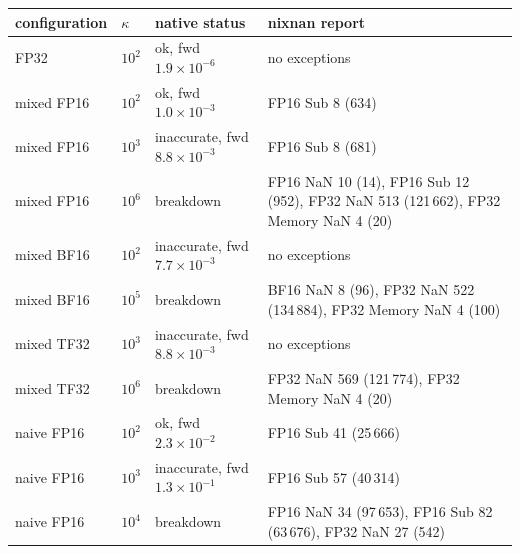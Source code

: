 \begin{tabular}{llp{3.2cm}p{5.8cm}}
\toprule
configuration & $\kappa$ & native status & nixnan report\\
\midrule
FP32 & $10^{2}$ & ok, fwd $1.9\!\times\!10^{-6}$ & no exceptions\\
mixed FP16 & $10^{2}$ & ok, fwd $1.0\!\times\!10^{-3}$ & FP16 Sub 8 (634)\\
mixed FP16 & $10^{3}$ & inaccurate, fwd $8.8\!\times\!10^{-3}$ & FP16 Sub 8 (681)\\
mixed FP16 & $10^{6}$ & breakdown & FP16 NaN 10 (14), FP16 Sub 12 (952), FP32 NaN 513 (121\,662), FP32 Memory NaN 4 (20)\\
mixed BF16 & $10^{2}$ & inaccurate, fwd $7.7\!\times\!10^{-3}$ & no exceptions\\
mixed BF16 & $10^{5}$ & breakdown & BF16 NaN 8 (96), FP32 NaN 522 (134\,884), FP32 Memory NaN 4 (100)\\
mixed TF32 & $10^{3}$ & inaccurate, fwd $8.8\!\times\!10^{-3}$ & no exceptions\\
mixed TF32 & $10^{6}$ & breakdown & FP32 NaN 569 (121\,774), FP32 Memory NaN 4 (20)\\
naive FP16 & $10^{2}$ & ok, fwd $2.3\!\times\!10^{-2}$ & FP16 Sub 41 (25\,666)\\
naive FP16 & $10^{3}$ & inaccurate, fwd $1.3\!\times\!10^{-1}$ & FP16 Sub 57 (40\,314)\\
naive FP16 & $10^{4}$ & breakdown & FP16 NaN 34 (97\,653), FP16 Sub 82 (63\,676), FP32 NaN 27 (542)\\
\bottomrule
\end{tabular}
